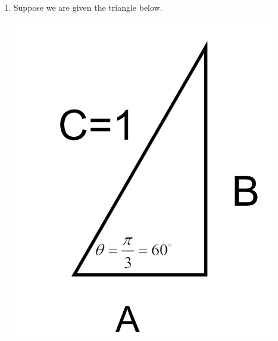 \documentclass[nooutcomes]{ximera}
\begin{document}
\begin{problem}
\begin{enumerate}
\begin{enumerate}
\begin{freeResponse}
	\end{freeResponse}
	\end{enumerate}

	\item Suppose we are given the triangle below.  
		\begin{image}
		\includegraphics[scale=.5]{figure3.png}
		\end{image}


\end{enumerate}
\end{problem}
\end{document}
